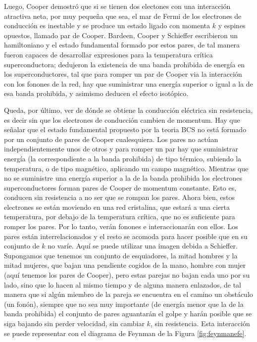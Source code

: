 Luego, Cooper demostró que si se tienen dos electones con una interacción atractiva neta, por muy pequeña que sea, el mar de Fermi de los electrones de conducción es inestable y se produce un estado ligado con momenta $k$ y espines opuestos, llamado par de Cooper. Bardeen, Cooper y Schieffer escribieron un hamiltoniano y el estado fundamental formado por estos pares, de tal manera fueron capaces de desarrollar expresiones para la temperatura crítica superconductora; dedujeron la existencia de una banda prohibida de energía en los superconductores, tal que para romper un par de Cooper via la interacción con los fonones de la red, hay que suministrar una energía superior o igual a la de esa banda prohibida, y asimismo deducen el efecto isotópico.

Queda, por último, ver de dónde se obtiene la conducción eléctrica sin resistencia, es decir sin que los electrones de conducción cambien de momentum. Hay que señalar que el estado fundamental propuesto por la teoria BCS no está formado por un conjunto de pares de Cooper cualesquiera. Los pares no actúan independientemente unos de otros y para romper un par hay que suministrar energía (la correspondiente a la banda prohibida) de tipo térmico, subiendo la temperatura, o de tipo magnético, aplicando un campo magnético. Mientras que no se suministre una energía superior a la de la banda prohibida los electrones superconductores forman pares de Cooper de momentum constante. Esto es, conducen sin resistencia a no ser que se rompan los pares. Ahora bien, estos electrones se están moviendo en una red cristalina, que estará a una cierta temperatura, por debajo de la temperatura crítica, que no es suficiente para romper los pares. Por lo tanto, verán fonones e interaccionarán con ellos. Los pares están interrelacionados y el resto se acomoda para hacer posible que en su conjunto de $k$ no varíe. Aquí se puede utilizar una imagen debida a Schieffer. Supongamos que tenemos un conjunto de esquiadores, la mitad hombres y la mitad mujeres, que bajan una pendiente cogidos de la mano, hombre con mujer (aquí tenemos los pares de Cooper), pero estas parejas no bajan cada uno por su lado, sino que lo hacen al mismo tiempo y de alguna manera enlazados, de tal manera que si algún miembro de la pareja se encuentra en el camino un obstáculo (un fonón), siempre que no sea muy importante (de energía menor que la de la banda prohibida) el conjunto de pares aguantarán el golpe y harán posible que se siga bajando sin perder velocidad, sin cambiar $k$, sin resistencia. Esta interacción se puede representar con el diagrama de Feynman de la Figura \ref{fig:feynmanefe}.

